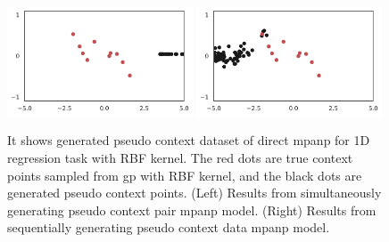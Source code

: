 \begin{figure}[t]
    \centering
    \includegraphics[width = 0.49\textwidth]{figure/direct2_pseudo.pdf}
    \includegraphics[width = 0.49\textwidth]{figure/direct8_pseudo.pdf}
    \caption{It shows generated pseudo context dataset of direct \gls{mpanp} for 1D regression task with RBF kernel. The red dots are true context points sampled from \gls{gp} with RBF kernel, and the black dots are generated pseudo context points. (Left) Results from simultaneously generating pseudo context pair \gls{mpanp} model. (Right) Results from sequentially generating pseudo context data \gls{mpanp} model.}
    \label{fig:direct_sample}
\end{figure}
